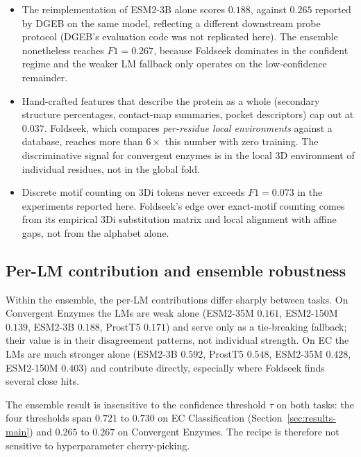\documentclass[11pt,letterpaper]{article}
\begin{document}
\begin{itemize}
\item The reimplementation of ESM2-3B alone scores $0.188$, against
      $0.265$ reported by DGEB on the same model, reflecting a
      different downstream probe protocol (DGEB's evaluation code was
      not replicated here). The ensemble nonetheless reaches
      $F1 = 0.267$, because Foldseek dominates in the confident regime
      and the weaker LM fallback only operates on the low-confidence
      remainder.
\item Hand-crafted features that describe the protein as a whole
      (secondary structure percentages, contact-map summaries,
      pocket descriptors) cap out at $0.037$. Foldseek, which compares
      \emph{per-residue local environments} against a database, reaches
      more than $6\times$ this number with zero training. The discriminative
      signal for convergent enzymes is in the local 3D environment of
      individual residues, not in the global fold.
\item Discrete motif counting on 3Di tokens never exceeds
      $F1 = 0.073$ in the experiments reported here. Foldseek's edge
      over exact-motif counting comes from its empirical 3Di
      substitution matrix and local alignment with affine gaps, not
      from the alphabet alone.
\end{itemize}

\subsection{Per-LM contribution and ensemble robustness}
\label{sec:per-lm}

Within the ensemble, the per-LM contributions differ sharply between
tasks. On Convergent Enzymes the LMs are weak alone (ESM2-35M $0.161$,
ESM2-150M $0.139$, ESM2-3B $0.188$, ProstT5 $0.171$) and serve only as
a tie-breaking fallback; their value is in their disagreement patterns,
not individual strength. On EC the LMs are much stronger alone
(ESM2-3B $0.592$, ProstT5 $0.548$, ESM2-35M $0.428$, ESM2-150M $0.403$)
and contribute directly, especially where Foldseek finds several close
hits.

The ensemble result is insensitive to the confidence threshold $\tau$
on both tasks: the four thresholds span $0.721$ to $0.730$ on EC
Classification (Section~\ref{sec:results-main}) and $0.265$ to $0.267$
on Convergent Enzymes. The recipe is therefore not sensitive to
hyperparameter cherry-picking.
\end{document}
